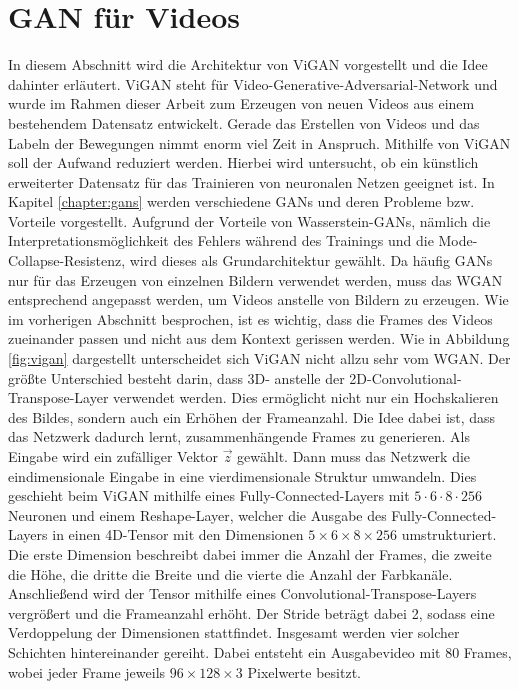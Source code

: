 \section{GAN für Videos}
In diesem Abschnitt wird die Architektur von ViGAN vorgestellt und die Idee
dahinter erläutert. ViGAN steht für Video-Generative-Adversarial-Network und
wurde im Rahmen dieser Arbeit zum Erzeugen von neuen Videos aus einem
bestehendem Datensatz entwickelt. Gerade das Erstellen von Videos und das Labeln
der Bewegungen nimmt enorm viel Zeit in Anspruch. Mithilfe von ViGAN soll der
Aufwand reduziert werden. Hierbei wird untersucht, ob ein künstlich erweiterter
Datensatz für das Trainieren von neuronalen Netzen geeignet ist. In Kapitel
\ref{chapter:gans} werden verschiedene GANs und deren Probleme bzw. Vorteile
vorgestellt. Aufgrund der Vorteile von Wasserstein-GANs, nämlich die
Interpretationsmöglichkeit des Fehlers während des Trainings und die
Mode-Collapse-Resistenz, wird dieses als Grundarchitektur gewählt. Da häufig
GANs nur für das Erzeugen von einzelnen Bildern verwendet werden, muss das WGAN
entsprechend angepasst werden, um Videos anstelle von Bildern zu erzeugen. Wie im
vorherigen Abschnitt besprochen, ist es wichtig, dass die Frames des Videos
zueinander passen und nicht aus dem Kontext gerissen werden. Wie in Abbildung
\ref{fig:vigan} dargestellt unterscheidet sich ViGAN nicht allzu sehr vom WGAN.
Der größte Unterschied besteht darin, dass 3D- anstelle
der 2D-Convolutional-Transpose-Layer verwendet werden. Dies ermöglicht nicht nur
ein Hochskalieren des Bildes, sondern auch ein Erhöhen der Frameanzahl. Die Idee
dabei ist, dass das Netzwerk dadurch lernt, zusammenhängende Frames zu
generieren. Als Eingabe wird ein zufälliger Vektor $\vec{z}$ gewählt. Dann muss
das Netzwerk die eindimensionale Eingabe in eine vierdimensionale Struktur
umwandeln. Dies geschieht beim ViGAN mithilfe eines Fully-Connected-Layers mit
$5 \cdot 6 \cdot 8 \cdot 256$ Neuronen und einem Reshape-Layer, welcher die
Ausgabe des Fully-Connected-Layers in einen 4D-Tensor mit den Dimensionen $5
\times 6 \times 8 \times 256$ umstrukturiert. Die erste Dimension beschreibt
dabei immer die Anzahl der Frames, die zweite die Höhe, die dritte die Breite
und die vierte die Anzahl der Farbkanäle. Anschließend wird der Tensor mithilfe
eines Convolutional-Transpose-Layers vergrößert und die Frameanzahl erhöht. Der
Stride beträgt dabei 2, sodass eine Verdoppelung der Dimensionen stattfindet.
Insgesamt werden vier solcher Schichten hintereinander gereiht. Dabei entsteht
ein Ausgabevideo mit 80 Frames, wobei jeder Frame jeweils $96 \times 128 \times
3$ Pixelwerte besitzt.

